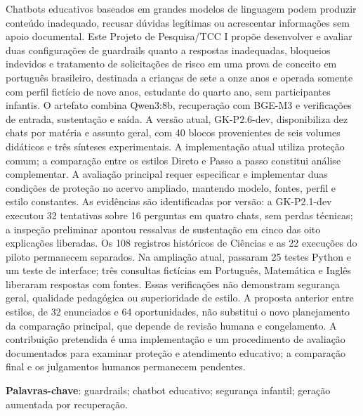 \documentclass[12pt,openany,oneside,a4paper,chapter=TITLE,english,brazil]{abntex2}
\begin{document}
\frenchspacing
\imprimircapa
\imprimirfolhaderosto*

\begin{resumo}[RESUMO]
\SingleSpacing\fontsize{11}{13.2}\selectfont
Chatbots educativos baseados em grandes modelos de linguagem podem produzir conteúdo inadequado, recusar dúvidas legítimas ou acrescentar informações sem apoio documental. Este Projeto de Pesquisa/TCC I propõe desenvolver e avaliar duas configurações de guardrails quanto a respostas inadequadas, bloqueios indevidos e tratamento de solicitações de risco em uma prova de conceito em português brasileiro, destinada a crianças de sete a onze anos e operada somente com perfil fictício de nove anos, estudante do quarto ano, sem participantes infantis. O artefato combina Qwen3:8b, recuperação com BGE-M3 e verificações de entrada, sustentação e saída. A versão atual, GK-P2.6-dev, disponibiliza dez chats por matéria e assunto geral, com 40 blocos provenientes de seis volumes didáticos e três sínteses experimentais. A implementação atual utiliza proteção comum; a comparação entre os estilos Direto e Passo a passo constitui análise complementar. A avaliação principal requer especificar e implementar duas condições de proteção no acervo ampliado, mantendo modelo, fontes, perfil e estilo constantes. As evidências são identificadas por versão: a GK-P2.1-dev executou 32 tentativas sobre 16 perguntas em quatro chats, sem perdas técnicas; a inspeção preliminar apontou ressalvas de sustentação em cinco das oito explicações liberadas. Os 108 registros históricos de Ciências e as 22 execuções do piloto permanecem separados. Na ampliação atual, passaram 25 testes Python e um teste de interface; três consultas fictícias em Português, Matemática e Inglês liberaram respostas com fontes. Essas verificações não demonstram segurança geral, qualidade pedagógica ou superioridade de estilo. A proposta anterior entre estilos, de 32 enunciados e 64 oportunidades, não substitui o novo planejamento da comparação principal, que depende de revisão humana e congelamento. A contribuição pretendida é uma implementação e um procedimento de avaliação documentados para examinar proteção e atendimento educativo; a comparação final e os julgamentos humanos permanecem pendentes.

\vspace{\onelineskip}\noindent\textbf{Palavras-chave}: guardrails; chatbot educativo; segurança infantil; geração aumentada por recuperação.
\end{resumo}
\end{document}
